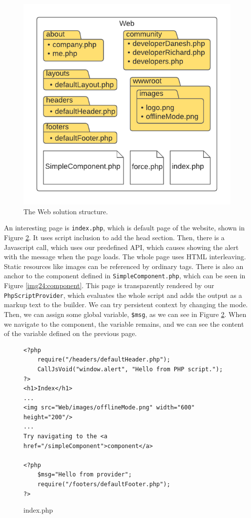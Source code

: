 \par
\begin{figure}[H]\centering
\includegraphics[scale=0.9]{./img/WebStructure}
\caption{The Web solution structure.}
\label{img22:web}
\end{figure} 
\par
An interesting page is \texttt{index.php}, which is default page of the website, shown in Figure \ref{img23:index}.
It uses script inclusion to add the head section.
Then, there is a Javascript call, which uses our predefined API, which causes showing the alert with the message when the page loads.
The whole page uses HTML interleaving.
Static resources like images can be referenced by ordinary tags.
There is also an anchor to the component defined in \texttt{SimpleComponent.php}, which can be seen in Figure \ref{img24:component}.
This page is transparently rendered by our \texttt{PhpScriptProvider}, which evaluates the whole script and adds the output as a markup text to the builder.
We can try persistent context by changing the mode.
Then, we can assign some global variable, \texttt{\$msg}, as we can see in Figure \ref{img23:index}.
When we navigate to the component, the variable remains, and we can see the content of the variable defined on the previous page.
\par
\begin{figure}[H]
\begin{lstlisting}
<?php
    require("/headers/defaultHeader.php");
    CallJsVoid("window.alert", "Hello from PHP script.");
?>
<h1>Index</h1>
...
<img src="Web/images/offlineMode.png" width="600" height="200"/>
...
Try navigating to the <a href="/simpleComponent">component</a>

<?php
    $msg="Hello from provider";
    require("/footers/defaultFooter.php");
?>
\end{lstlisting}
\caption{index.php}
\label{img23:index}
\end{figure}
